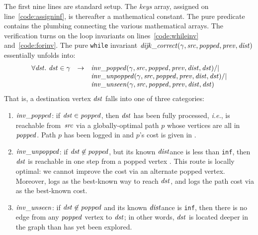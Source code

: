 The first nine lines are standard setup.
The \emph{keys} array, assigned on line~\ref{code:assigninf},
is thereafter a mathematical constant.
The pure predicate  contains the plumbing connecting the
various mathematical arrays.
The verification turns on the loop
invariants on lines~\ref{code:whileinv} and~\ref{code:forinv}.  The pure \texttt{while} invariant $\mathit{dijk\_correct}(\gamma, \mathit{src}, \mathit{popped}, \mathit{prev}, \mathit{dist})$ essentially unfolds into:
\[
\begin{array}{lcl}
\forall \m{dst}.~\m{dst} \in \gamma & -> & \m{inv\_popped}(\gamma, \m{src}, \m{popped}, \m{prev}, \m{dist}, \m{dst}) /| \null \\
&&\m{inv\_unpopped}(\gamma, \m{src}, \m{popped}, \m{prev}, \m{dist}, \m{dst}) /| \null \\
&&\m{inv\_unseen}(\gamma, \m{src}, \m{popped}, \m{prev}, \m{dist}, \m{dst})
\end{array}
\]
That is, a destination vertex $\mathit{dst}$ falls into one of three
categories:
\begin{enumerate}
\item $\mathit{inv\_popped}$: if $\mathit{dst} \in \mathit{popped}$,
then $\mathit{dst}$ has been fully processed, \emph{i.e.},  is reachable from~$\mathit{src}$
via a globally-optimal path $p$ whose vertices are all in $\mathit{popped}$.  Path $p$ has been logged in  and $p$'s cost is given in .


\item $\mathit{inv\_unpopped}$: if $\mathit{dst} \not \in \mathit{popped}$, but its known $\mathit{dist}$ance is less than
\texttt{inf}, then $\mathit{dst}$ is reachable in one step from a popped vertex .
This route is locally optimal: we cannot improve the cost via an alternate popped vertex.
Moreover,  logs
 as the best-known way to reach $\mathit{dst}$, and 
logs the path cost via  as the best-known cost.
\item $\mathit{inv\_unseen}$: if $\mathit{dst} \not \in \mathit{popped}$ and its known $\mathit{dist}$ance is \texttt{inf}, then
there is no edge from any $\mathit{popped}$ vertex to $\mathit{dst}$; in other words, $\mathit{dst}$ is located deeper in the graph
than has yet been explored.
\end{enumerate}
